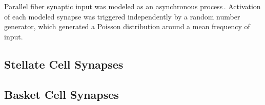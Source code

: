 \documentclass[12pt]{article}
\begin{document}
Parallel fiber synaptic input was modeled
as an asynchronous process\,\cite{Bernard:1991ye}.
Activation of each modeled synapse was triggered independently
by a random number generator, which generated a Poisson distribution
around a mean frequency of input.

\subsection*{Stellate Cell Synapses}


\subsection*{Basket Cell Synapses}



\end{document}

